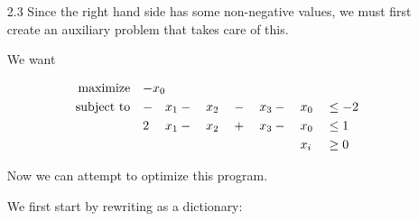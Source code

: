 \documentclass[12pt,letterpaper]{article}
\newcommand*\enterleave[2]{
  So we can let #1 enter and #2 leave.
}
\newcommand*\morerestrictive[2]{
  The more restrictive constraint is that #1 $\leq$ #2, so set #1 $=$ #2.
}
\newcommand*\newdict{
  So we have a new dictionary:
}
\newcommand*\newvalue[2]{
  This gives a new value for #1. #1 $ = $ #2
}
\newcommand*\opt{
  Since we have no more optimizable variables
  (all variable coefficients of $\zeta$ are non-positive),
  we can no longer maximize $\zeta$.
}
\newcommand*\optsolution[2]{
  Then we have an optimal solution with #1, and value #2.
}
\begin{document}
\begin{enumerate}
      \morerestrictive{$x_1$}{$1$}

      \enterleave{$x_1$}{$x_6$}

      \[
        x_1 = 1 + 5x_2 - x_6
      \]

      \newvalue{$x_3$}{$2 - 9x_2 + 2x_6$}

      \newvalue{$x_4$}{$1 + 7x_2 + 2x_6$}

      \newvalue{$x_5$}{$1 + 19x_2 + 4x_6$}

      \newvalue{$\zeta$}{$2 - 9x_2 - 2x_6$}

      \newdict

      \begin{alignat*}{16}
        \zeta & {}={} & 2 & {}-{} & 9  & x_2 & {}-{} & 2 & x_6 \\
        x_3   & {}={} & 2 & {}-{} & 9  & x_2 & {}+{} & 2 & x_6 \\
        x_4   & {}={} & 1 & {}+{} & 7  & x_2 & {}+{} & 2 & x_6 \\
        x_5   & {}={} & 1 & {}+{} & 19 & x_2 & {}+{} & 4 & x_6 \\
        x_1   & {}={} & 1 & {}+{} & 5  & x_2 & {}-{} &   & x_6 \\
      \end{alignat*}

      \opt

      \optsolution{$x_1 = 1, x_2 = 0$}{2}
    \item [2.3]
      Since the right hand side has some non-negative values,
      we must first create an auxiliary problem that takes care of this.

      We want

      \begin{alignat*}{13}
        \text{maximize}   \quad & \mathrlap{-x_0} \\
        \text{subject to} \quad & - & x_1 & {}-{} &   & x_2 & {}-{} &   & x_3 & {}-{} &   & x_0 && \leq -2 \\
                                & 2 & x_1 & {}-{} &   & x_2 & {}+{} &   & x_3 & {}-{} &   & x_0 && \leq  1 \\
                                &   &     &       &   &     &       &   &     &       &   & x_i && \geq  0 \\
      \end{alignat*}

      Now we can attempt to optimize this program.

      We first start by rewriting as a dictionary:


\end{enumerate}
\end{document}

